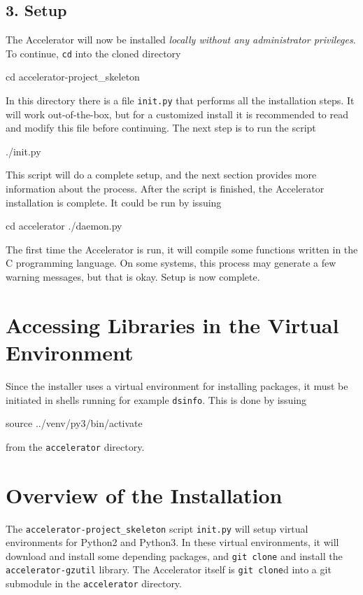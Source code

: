 \documentclass[a4paper]{article}
\begin{document}
\subsection*{3. Setup}
The Accelerator will now be installed \textsl{locally without any
  administrator privileges}.  To continue, \texttt{cd} into the cloned
directory
\begin{shell}
cd accelerator-project_skeleton
\end{shell}
In this directory there is a file \texttt{init.py} that performs all
the installation steps.  It will work out-of-the-box, but for a
customized install it is recommended to read and modify this file
before continuing.  The next step is to run the script
\begin{shell}
./init.py
\end{shell}
This script will do a complete setup, and the next section provides
more information about the process.  After the script is finished, the
Accelerator installation is complete.  It could be run by issuing
\begin{shell}
cd accelerator
./daemon.py  
\end{shell}
The first time the Accelerator is run, it will compile some functions
written in the C programming language.  On some systems, this process
may generate a few warning messages, but that is okay.  Setup is now
complete.  \thispagestyle{empty}

\section*{Accessing Libraries in the Virtual Environment}
Since the installer uses a virtual environment for installing
packages, it must be initiated in shells running for example
\texttt{dsinfo}.  This is done by issuing
\begin{shell}
source ../venv/py3/bin/activate
\end{shell}
from the \texttt{accelerator} directory.



\section*{Overview of the Installation}
The \texttt{accelerator-project\_skeleton} script \texttt{init.py}
will setup virtual environments for Python2 and Python3.  In these
virtual environments, it will download and install some depending
packages, and \texttt{git clone} and install the
\texttt{accelerator-gzutil} library.  The Accelerator itself is
\texttt{git clone}d into a git submodule in the \texttt{accelerator}
directory.
\end{document}
